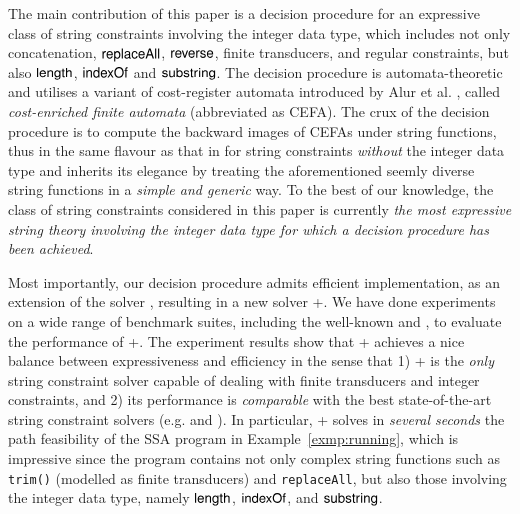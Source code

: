 The main contribution of this paper is a decision procedure for an expressive class of string constraints involving the integer data type, which includes not only concatenation, $\mathsf{replaceAll}$, $\mathsf{reverse}$, finite transducers, and regular constraints, but also $\mathsf{length}$, $\mathsf{indexOf}$ and $\mathsf{substring}$. The decision procedure is automata-theoretic and utilises a variant of cost-register automata introduced by Alur et al. \cite{RLJ+13}, called \emph{cost-enriched finite automata} (abbreviated as CEFA). The crux of the decision procedure is to compute the backward images of CEFAs under string functions, thus in the same flavour as that in \cite{CHL+19} for string constraints \emph{without} the integer data type and inherits its elegance by treating the aforementioned seemly diverse string functions in a \emph{simple and generic} way. To the best of our knowledge, the class of string constraints considered in this paper is currently \emph{the most expressive string theory involving the integer data type for which a decision procedure has been achieved}. 

Most importantly, our decision procedure admits efficient implementation, as an extension of the {\ostrich} solver \cite{CHL+19}, resulting in a new solver {\ostrich}+.  We have done experiments on a wide range of benchmark suites, including the well-known {\kaluzabench} and {\pyexbench}, to evaluate the performance of {\ostrich}+. The experiment results show that  {\ostrich}+ achieves a nice balance between expressiveness and efficiency in the sense that 1) {\ostrich}+ is the \emph{only} string constraint solver capable of dealing with finite transducers and integer constraints, and 2) its performance is \emph{comparable} with the best state-of-the-art string constraint solvers (e.g. {\cvc} and {\zthreetrau}). In particular, {\ostrich}+ solves in \emph{several seconds} the path feasibility of the SSA program in Example~\ref{exmp:running}, which is impressive since the program contains not only complex string functions such as {\tt trim()} (modelled as finite transducers) and {\tt replaceAll}, but also those involving the integer data type, namely $\mathsf{length}$, $\mathsf{indexOf}$, and $\mathsf{substring}$. 



